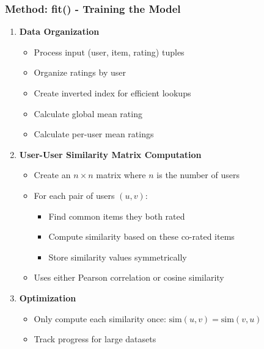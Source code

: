 \documentclass{beamer}
\begin{document}
\begin{frame}
\frametitle{Method: fit() - Training the Model}

\begin{enumerate}
    \item \textbf{Data Organization}
    \begin{itemize}
        \item Process input (user, item, rating) tuples
        \item Organize ratings by user
        \item Create inverted index for efficient lookups
        \item Calculate global mean rating
        \item Calculate per-user mean ratings
    \end{itemize}
    
    \item \textbf{User-User Similarity Matrix Computation}
    \begin{itemize}
        \item Create an $n \times n$ matrix where $n$ is the number of users
        \item For each pair of users $(u,v)$:
        \begin{itemize}
            \item Find common items they both rated
            \item Compute similarity based on these co-rated items
            \item Store similarity values symmetrically
        \end{itemize}
        \item Uses either Pearson correlation or cosine similarity
    \end{itemize}
    
    \item \textbf{Optimization}
    \begin{itemize}
        \item Only compute each similarity once: $\text{sim}(u,v) = \text{sim}(v,u)$
        \item Track progress for large datasets
    \end{itemize}
\end{enumerate}
\end{frame}
\end{document}
